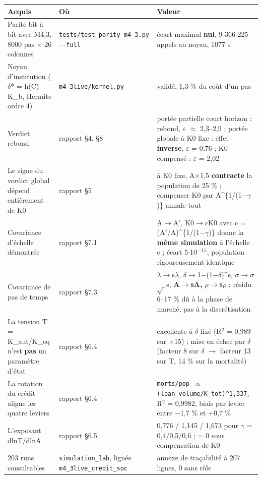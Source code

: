 \documentclass[11pt,a4paper]{article}
\newcommand{\code}[1]{\texttt{#1}}
\begin{document}
\begin{center}
\begin{tabularx}{\linewidth}{@{}XXX@{}}
\toprule
\textbf{Acquis} & \textbf{Où} & \textbf{Valeur} \\
\midrule
Parité bit à bit avec M4.3, 8000 pas \ensuremath{\times} 26 colonnes & \code{tests/test\_parity\_m4\_3.py -{}-full} & écart maximal \textbf{nul}, 9 366 225 appels au noyau, 1077 s \\
Noyau d'institution (\ensuremath{\delta}* = h(C) \ensuremath{-} K\_b, Hermite ordre 4) & \code{m4\_3live/kernel.py} & validé, 1,3 \% du coût d'un pas \\
Verdict rebond & rapport §4, §8 & portée partielle court horizon : rebond, \ensuremath{\varepsilon} \ensuremath{\approx} 2,3--2,9 ; portée globale à K0 fixe : effet \textbf{inverse}, \ensuremath{\varepsilon} = 0,76 ; K0 compensé : \ensuremath{\varepsilon} = 2,02 \\
Le signe du verdict global dépend entièrement de K0 & rapport §5 & à K0 fixe, A\ensuremath{\times}1,5 \textbf{contracte} la population de 25 \% ; compenser K0 par A\textasciicircum{}\{1/(1\ensuremath{-}\ensuremath{\gamma})\} annule tout \\
Covariance d'échelle démontrée & rapport §7.1 & A\ensuremath{\rightarrow}A\ensuremath{'}, K0\ensuremath{\rightarrow}cK0 avec c = (A\ensuremath{'}/A)\textasciicircum{}\{1/(1\ensuremath{-}\ensuremath{\gamma})\} donne la \textbf{même simulation} à l'échelle c ; écart 5\ensuremath{\cdot}10\ensuremath{^-}\ensuremath{^1}\ensuremath{^5}, population rigoureusement identique \\
Covariance de pas de temps & rapport §7.3 & \ensuremath{\lambda}\ensuremath{\rightarrow}s\ensuremath{\lambda}, \ensuremath{\delta}\ensuremath{\rightarrow}1\ensuremath{-}(1\ensuremath{-}\ensuremath{\delta})\textasciicircum{}s, \ensuremath{\sigma}\ensuremath{\rightarrow}\ensuremath{\sigma}\ensuremath{\sqrt{\;}}s, \textbf{A\ensuremath{\rightarrow}sA, \ensuremath{\rho}\ensuremath{\rightarrow}s\ensuremath{\rho}} ; résidu 6--17 \% dû à la phase de marché, pas à la discrétisation \\
La tension T = K\_aut/K\_eq n'est \textbf{pas} un paramètre d'état & rapport §6.4 & excellente à \ensuremath{\delta} fixé (R\ensuremath{^2} = 0,989 sur \ensuremath{\times}15) ; mise en échec par \ensuremath{\delta} (facteur 8 sur \ensuremath{\delta} \ensuremath{\rightarrow} facteur 13 sur T, 14 \% sur la mortalité) \\
La rotation du crédit aligne les quatre leviers & rapport §6.4 & \code{morts/pop \ensuremath{\propto} (loan\_volume/K\_tot)\textasciicircum{}1,337}, R\ensuremath{^2} = 0,9982, biais par levier entre \ensuremath{-}1,7 \% et +0,7 \% \\
L'exposant dlnT/dlnA & rapport §6.5 & 0,776 / 1,145 / 1,673 pour \ensuremath{\gamma} = 0,4/0,5/0,6 ; = 0 sous compensation de K0 \\
203 runs consultables & \code{simulation\_lab}, lignée \code{m4\_3live\_credit\_soc} & annexe de traçabilité à 207 lignes, 0 sans rôle \\
\bottomrule
\end{tabularx}
\end{center}
\end{document}
